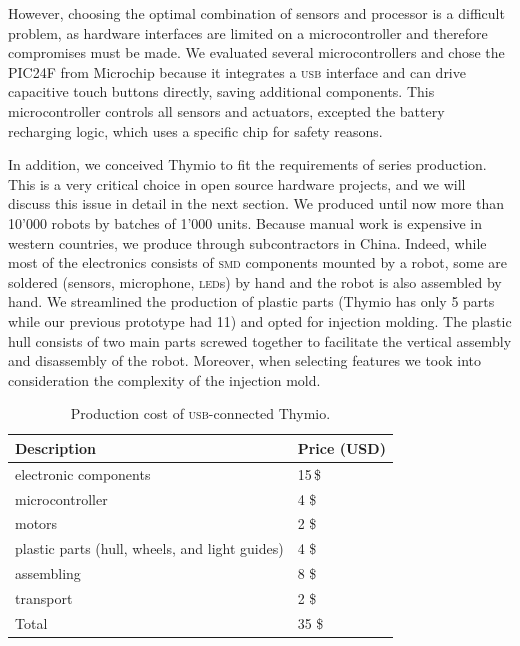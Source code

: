 \documentclass[letterpaper, 10 pt, conference]{ieeeconf}  %
\begin{document}
However, choosing the optimal combination of sensors and processor is a difficult problem, as hardware interfaces are limited on a microcontroller and therefore compromises must be made.
We evaluated several microcontrollers and chose the PIC24F from Microchip because it integrates a \textsc{usb} interface and can drive capacitive touch buttons directly, saving additional components. 
This microcontroller controls all sensors and actuators, excepted the battery recharging logic, which uses a specific chip for safety reasons.

In addition, we conceived Thymio to fit the requirements of series production.
This is a very critical choice in open source hardware projects, and we will discuss this issue in detail in the next section.
We produced until now more than 10'000 robots by batches of 1'000 units.
Because manual work is expensive in western countries, we produce through subcontractors in China.
Indeed, while most of the electronics consists of \textsc{smd} components mounted by a robot, some are soldered (sensors, microphone, \textsc{led}s) by hand and the robot is also assembled by hand.
We streamlined the production of plastic parts (Thymio has only 5 parts while our previous prototype had 11) and opted for injection molding. 
The plastic hull consists of two main parts screwed together to facilitate the vertical assembly and disassembly of the robot.
Moreover, when selecting features we took into consideration the complexity of the injection mold.

\begin{table}
\centering
\begin{tabularx}{\columnwidth}{ll}
\toprule
Description & Price (USD)\\
\midrule
electronic components & 15\,\$ \\
microcontroller & 4 \$ \\
motors & 2 \$ \\
plastic parts (hull, wheels, and light guides) & 4 \$ \\
assembling & 8 \$ \\
transport & 2 \$ \\
\bottomrule
Total & 35 \$ \\
\end{tabularx}
\caption{Production cost of \textsc{usb}-connected Thymio.}
\label{tbl:thymio-price}
\end{table}
\end{document}
